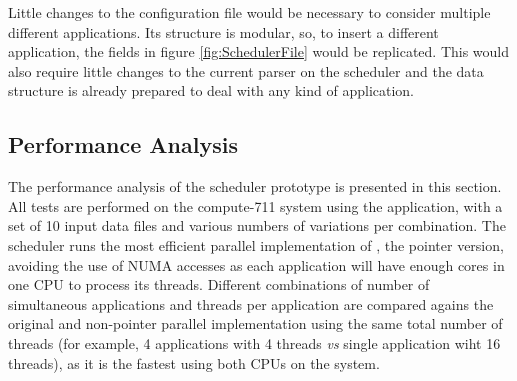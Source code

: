 Little changes to the configuration file would be necessary to consider multiple different applications. Its structure is modular, so, to insert a different application, the fields in figure \ref{fig:SchedulerFile} would be replicated. This would also require little changes to the current parser on the scheduler and the data structure is already prepared to deal with any kind of application.

\subsection{Performance Analysis}
\label{SchedulerPerformance}

The performance analysis of the scheduler prototype is presented in this section. All tests are performed on the compute-711 system using the \tth application, with a set of 10 input data files and various numbers of variations per combination. The scheduler runs the most efficient parallel implementation of \tth, the pointer version, avoiding the use of NUMA accesses as each application will have enough cores in one CPU to process its threads. Different combinations of number of simultaneous applications and threads per application are compared agains the original \tth and non-pointer parallel implementation using the same total number of threads (for example, 4 applications with 4 threads \textit{vs} single application wiht 16 threads), as it is the fastest using both CPUs on the system.

